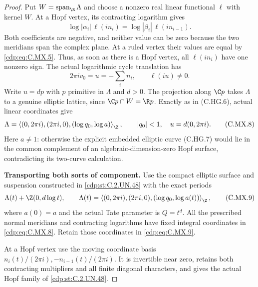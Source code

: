 \begin{proof}
Put $W=\operatorname{span}_{\R}\Lambda$ and choose
a nonzero real linear functional $\ell$ with
kernel $W$. At a Hopf vertex, its contracting
logarithm gives
\[
 \log|\alpha_i|\,\ell(i n_i)
        =\log|\beta_i|\,\ell(i n_{i-1}).
                                                        \tag{C.MX.6}\label{cdp:eq:C.MX.6}
\]
Both coefficients are negative, and neither value
can be zero because the two meridians span the
complex plane. At a ruled vertex their values
are equal by \eqref{cdp:eq:C.MX.5}. Thus, as soon as there is
a Hopf vertex, all $\ell(i n_i)$ have one nonzero
sign. The actual logarithmic cycle translation has
\[
                  2\pi i v_0=u=-\sum_i n_i,\qquad
                              \ell(iu)\ne0 .            \tag{C.MX.7}\label{cdp:eq:C.MX.7}
\]
Write $u=d p$ with $p$ primitive in $\Lambda$ and
$d>0$. The projection along $\C p$ takes $\Lambda$
to a genuine elliptic lattice, since
$\C p\cap W=\R p$. Exactly as in (C.HG.6), actual
linear coordinates give
\[
 \Lambda=\left\langle
 (0,2\pi i),(2\pi i,0),(\log q_0,\log a)
                     \right\rangle_{\Z},\qquad
              |q_0|<1,\quad u=d(0,2\pi i).             \tag{C.MX.8}\label{cdp:eq:C.MX.8}
\]
Here $a\ne1$: otherwise the explicit embedded
elliptic curve (C.HG.7) would lie in the common
complement of an algebraic-dimension-zero Hopf
surface, contradicting its two-curve calculation.

\par\medskip\noindent\textbf{Transporting both sorts of component.}
Use the compact elliptic surface and suspension
constructed in \ref{cdp:st:C.2.UN.48} with the exact periods
\[
 \Lambda(t)+\Z(0,d\log t),\qquad
 \Lambda(t)=\left\langle
 (0,2\pi i),(2\pi i,0),(\log q_0,\log a(t))
                         \right\rangle_{\Z},             \tag{C.MX.9}\label{cdp:eq:C.MX.9}
\]
where $a(0)=a$ and the actual Tate parameter is
$Q=t^d$. All the prescribed normal meridians and
contracting logarithms have fixed integral
coordinates in \eqref{cdp:eq:C.MX.8}. Retain those coordinates
in \eqref{cdp:eq:C.MX.9}.

At a Hopf vertex use the moving coordinate basis
$n_i(t)/(2\pi i),-n_{i-1}(t)/(2\pi i)$.
It is invertible near zero, retains both
contracting multipliers and all finite diagonal
characters, and gives the actual Hopf family
of \ref{cdp:st:C.2.UN.48}.


\end{proof}
